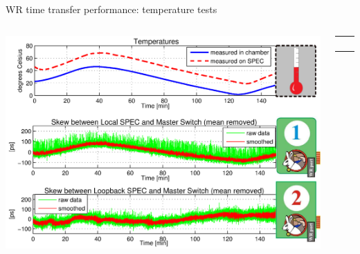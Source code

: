 \documentclass[compress,red]{beamer}
\begin{document}
\begin{frame}{WR time transfer performance: temperature tests}

  \begin{columns}[c]
		\hspace{-1.0cm}
		\begin{center}
		\includegraphics[width=1.1\textwidth]{measurements/tempTests-trends_v3.pdf}
		\end{center}

		\begin{center}
		  \begin{table}[!t] \footnotesize 
		  \begin{tabular}{ c  c }     
		  \multicolumn{2}{c}{ }       \\         
		   \multicolumn{2}{c}{ }       \\    
		     &    \\ 
		    &     \\ 
		  \end{tabular}
		  \end{table}   		
		\end{center}


\end{columns}
\end{frame}
\end{document}
